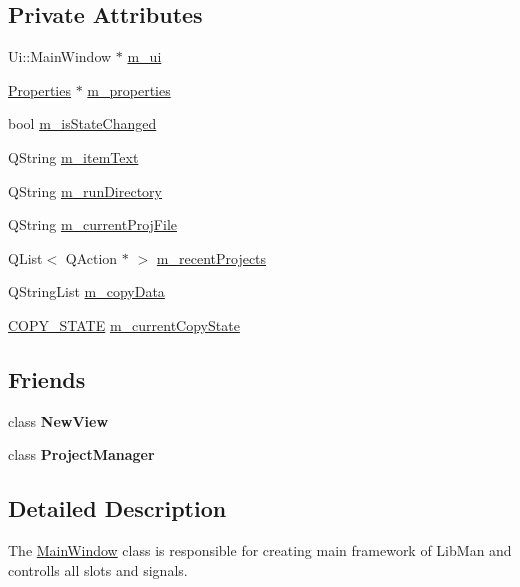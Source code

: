 \subsection*{Private Attributes}
\begin{DoxyCompactItemize}
\item 
Ui\-::\-Main\-Window $\ast$ \hyperlink{classMainWindow_a5a3eb262660797d9a4d52ed16edb6d11}{m\-\_\-ui}
\item 
\hyperlink{classProperties}{Properties} $\ast$ \hyperlink{classMainWindow_a22f004bec556234a5eb739cfa1819647}{m\-\_\-properties}
\item 
bool \hyperlink{classMainWindow_a3c61f9d7deec39afb315e57ef159ba18}{m\-\_\-is\-State\-Changed}
\item 
Q\-String \hyperlink{classMainWindow_a494664d1901f3d94237411b34e7a2a16}{m\-\_\-item\-Text}
\item 
Q\-String \hyperlink{classMainWindow_a9294c8737725afe7b0b7dcc311881959}{m\-\_\-run\-Directory}
\item 
Q\-String \hyperlink{classMainWindow_ade3f7ebe5eb1bf67444cd41b2bc38aca}{m\-\_\-current\-Proj\-File}
\item 
Q\-List$<$ Q\-Action $\ast$ $>$ \hyperlink{classMainWindow_a4135ecd5a58b2679333740dddc8d2cf8}{m\-\_\-recent\-Projects}
\item 
Q\-String\-List \hyperlink{classMainWindow_a306adca5f257e5aeaa50ff06605a7a86}{m\-\_\-copy\-Data}
\item 
\hyperlink{classMainWindow_afed3bafbe5c97894b6661920e82526f9}{C\-O\-P\-Y\-\_\-\-S\-T\-A\-T\-E} \hyperlink{classMainWindow_a77153a35340c4a8a40f8528301bd96ad}{m\-\_\-current\-Copy\-State}
\end{DoxyCompactItemize}
\subsection*{Friends}
\begin{DoxyCompactItemize}
\item 
\hypertarget{classMainWindow_a132813282374dcbc6788609035b58c5a}{class {\bfseries New\-View}}\label{classMainWindow_a132813282374dcbc6788609035b58c5a}

\item 
\hypertarget{classMainWindow_aa860c957116c15c1b786357fbcd19fc7}{class {\bfseries Project\-Manager}}\label{classMainWindow_aa860c957116c15c1b786357fbcd19fc7}

\end{DoxyCompactItemize}


\subsection{Detailed Description}
The \hyperlink{classMainWindow}{Main\-Window} class is responsible for creating main framework of Lib\-Man and controlls all slots and signals. 



